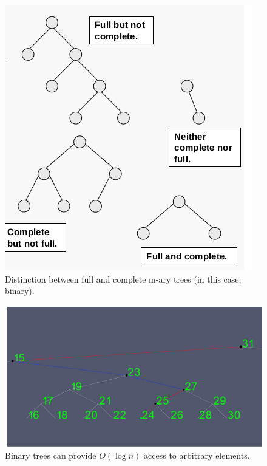 \documentclass[a4paper,10pt]{report}
\begin{document}
\begin{figure}[H]
	\begin{centering}
	\begin{center}
	\includegraphics[width=\linewidth]{./Pictures/full_complete.png}
	\caption{Distinction between full and complete m-ary trees (in this case, binary).}
	\label{fig:??????}
	\end{center}
	\par\end{centering}
\end{figure}

\begin{figure}[H]
	\begin{centering}
	\begin{center}
	\includegraphics[width=\linewidth]{./Pictures/binary_tree_search.png}
	\caption{Binary trees can provide $O(\log n)$ access to arbitrary elements.}
	\label{fig:??????}
	\end{center}
	\par\end{centering}
\end{figure}
\end{document}
